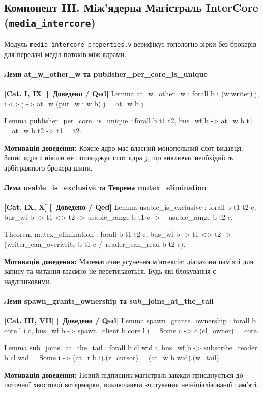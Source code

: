 \documentclass{article}
\let\originalfootnotesize\footnotesize
\let\oldverbatim\verbatim
\let\oldendverbatim\endverbatim
\renewenvironment{verbatim}{\originalfootnotesize\oldverbatim}{\oldendverbatim}
\newcommand{\thmcategory}[1]{{\small\textbf{\color{coreblue}[#1]}}}
\newcommand{\thmproven}{{\small\textbf{\color{productgreen}[\checkmark\ Доведено / Qed]}}}
\newcommand{\thmmotivation}[1]{%
  \par\smallskip\noindent\colorbox{boxbg}{\parbox{\dimexpr\linewidth-2\fboxsep\relax}{%
    \small\textbf{Мотивація доведення:} #1%
  }}\par\medskip
}
\begin{document}
\subsection[Компонент III. Між'ядерна Магістраль InterCore]{Компонент III. Між'ядерна Магістраль InterCore (\texttt{media\_intercore})}

Модуль \texttt{media\_intercore\_properties.v} верифікує топологію зірки без брокерів для передачі медіа-потоків між ядрами.

\paragraph{Леми at\_w\_other\_w та publisher\_per\_core\_is\_unique} \thmcategory{Cat. I, IX} \thmproven
\begin{verbatim}
Lemma at_w_other_w : forall b i (w:writer) j,
  i <> j -> at_w (put_w i w b) j = at_w b j.

Lemma publisher_per_core_is_unique : forall b t1 t2, bus_wf b ->
  at_w b t1 = at_w b t2 -> t1 = t2.
\end{verbatim}
\thmmotivation{Кожне ядро має власний монопольний слот видавця. Запис ядра $i$ ніколи не пошкоджує слот ядра $j$, що виключає необхідність арбітражного брокера шини.}

\paragraph{Лема usable\_is\_exclusive та Теорема mutex\_elimination} \thmcategory{Cat. IX, X} \thmproven
\begin{verbatim}
Lemma usable_is_exclusive : forall b t1 t2 c, bus_wf b ->
  t1 <> t2 -> usable_range b t1 c -> ~ usable_range b t2 c.

Theorem mutex_elimination : forall b t1 t2 c, bus_wf b ->
  t1 <> t2 ->
  ~ (writer_can_overwrite b t1 c /\ reader_can_read b t2 c).
\end{verbatim}
\thmmotivation{Математичне усунення м'ютексів: діапазони пам'яті для запису та читання взаємно не перетинаються. Будь-які блокування є надлишковими.}

\paragraph{Леми spawn\_grants\_ownership та sub\_joins\_at\_the\_tail} \thmcategory{Cat. III, VII} \thmproven
\begin{verbatim}
Lemma spawn_grants_ownership : forall b core l i c,
  bus_wf b -> spawn_client b core l i = Some c ->
  c.(cl_owner) = core.

Lemma sub_joins_at_the_tail : forall b cl wid i,
  bus_wf b -> subscribe_reader b cl wid = Some i ->
  (at_r b i).(r_cursor) = (at_w b wid).(w_tail).
\end{verbatim}
\thmmotivation{Новий підписник магістралі завжди приєднується до поточної хвостової вотермарки, виключаючи зчитування неініціалізованої пам'яті.}
\end{document}
